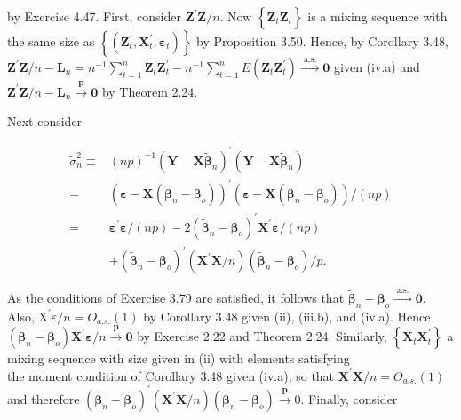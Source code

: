 \documentclass[10pt]{article}
\begin{document}
by Exercise 4.47. First, consider $\mathbf{Z}^{\prime} \mathbf{Z} / n$. Now $\left\{\mathbf{Z}_{t} \mathbf{Z}_{t}^{\prime}\right\}$ is a mixing sequence with the same size as $\left\{\left(\mathbf{Z}_{t}^{\prime}, \mathbf{X}_{t}^{\prime}, \boldsymbol{\varepsilon}_{t}\right)\right\}$ by Proposition 3.50. Hence, by Corollary 3.48, $\mathbf{Z}^{\prime} \mathbf{Z} / n-\mathbf{L}_{n}=n^{-1} \sum_{t=1}^{n} \mathbf{Z}_{t} \mathbf{Z}_{t}^{\prime}-n^{-1} \sum_{t=1}^{n} E\left(\mathbf{Z}_{t} \mathbf{Z}_{t}^{\prime}\right) \xrightarrow{\text { a.s. }} \mathbf{0}$ given (iv.a) and $\mathbf{Z}^{\prime} \mathbf{Z} / n-\mathbf{L}_{n} \xrightarrow{\boldsymbol{p}} \mathbf{0}$ by Theorem 2.24.

Next consider

$$
\begin{aligned}
\tilde{\sigma}_{n}^{2} \equiv & (n p)^{-1}\left(\mathbf{Y}-\mathbf{X} \tilde{\boldsymbol{\beta}}_{n}\right)^{\prime}\left(\mathbf{Y}-\mathbf{X} \tilde{\boldsymbol{\beta}}_{n}\right) \\
= & \left(\boldsymbol{\varepsilon}-\mathbf{X}\left(\tilde{\boldsymbol{\beta}}_{n}-\boldsymbol{\beta}_{o}\right)\right)^{\prime}\left(\boldsymbol{\varepsilon}-\mathbf{X}\left(\tilde{\boldsymbol{\beta}}_{n}-\boldsymbol{\beta}_{o}\right)\right) /(n p) \\
= & \boldsymbol{\varepsilon}^{\prime} \boldsymbol{\varepsilon} /(n p)-2\left(\tilde{\boldsymbol{\beta}}_{n}-\boldsymbol{\beta}_{o}\right)^{\prime} \mathbf{X}^{\prime} \boldsymbol{\varepsilon} /(n p) \\
& +\left(\tilde{\boldsymbol{\beta}}_{n}-\boldsymbol{\beta}_{o}\right)^{\prime}\left(\mathbf{X}^{\prime} \mathbf{X} / n\right)\left(\tilde{\boldsymbol{\beta}}_{n}-\boldsymbol{\beta}_{o}\right) / p .
\end{aligned}
$$

As the conditions of Exercise 3.79 are satisfied, it follows that $\tilde{\boldsymbol{\beta}}_{n}-\boldsymbol{\beta}_{o} \xrightarrow{\text { a.s. }} \mathbf{0}$. Also, $\mathrm{X}^{\prime} \varepsilon / n=O_{a . s .}(1)$ by Corollary 3.48 given (ii), (iii.b), and (iv.a). Hence $\left(\tilde{\boldsymbol{\beta}}_{n}-\boldsymbol{\beta}_{o}\right) \mathbf{X}^{\prime} \boldsymbol{\varepsilon} / n \xrightarrow{\boldsymbol{p}} \mathbf{0}$ by Exercise 2.22 and Theorem 2.24. Similarly, $\left\{\mathbf{X}_{t} \mathbf{X}_{t}^{\prime}\right\}$ a mixing sequence with size given in (ii) with elements satisfying\\
the moment condition of Corollary 3.48 given (iv.a), so that $\mathbf{X}^{\prime} \mathbf{X} / n= O_{a . s .}(1)$ and therefore $\left(\tilde{\boldsymbol{\beta}}_{n}-\boldsymbol{\beta}_{o}\right)^{\prime}\left(\mathbf{X}^{\prime} \mathbf{X} / n\right)\left(\tilde{\boldsymbol{\beta}}_{n}-\boldsymbol{\beta}_{o}\right) \xrightarrow{\boldsymbol{p}} 0$. Finally, consider
\end{document}
